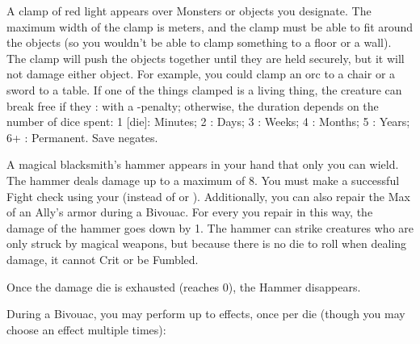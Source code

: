 {A clamp of red light appears over \DICE Monsters or objects you designate. The maximum width of the clamp is \DICE meters, and the clamp must be able to fit around the objects (so you wouldn't be able to clamp something to a floor or a wall).  The clamp will push the objects together until they are held securely, but it will not damage either object.  For example, you could clamp an orc to a chair or a sword to a table.  If one of the things clamped is a living thing, the creature can break free if they \RB : \VIG with a -\DICE penalty; otherwise, the duration depends on the number of dice spent:  1 [die]: Minutes; 2 \DICE: Days; 3 \DICE: Weeks; 4 \DICE: Months; 5 \DICE: Years; 6+ \DICE: Permanent.  Save negates.

\LITURGY [
  Name= Hammer of the Forge,
  Link=vulcan-liturgy-hammer,
  Paradigm= Force ,
  Save=  N ,
  Duration= Session ,
  Counter=  n/a  ,
  Keywords= None ,
  Target=   Self
]



A magical blacksmith's hammer appears in your hand that only you can wield.  The hammer deals \DICE damage up to a maximum of 8. You must make a successful Fight check using your \FOC (instead of \VIG or \DEX).   Additionally, you can also repair the Max \UD of an Ally's armor during a Bivouac.  For every \DCUP you repair in this way, the damage of the hammer goes down by 1.  The hammer can strike creatures who are only struck by magical weapons, but because there is no die to roll when dealing damage, it cannot Crit or be Fumbled.  

Once the damage die is exhausted (reaches 0), the Hammer disappears.

\LITURGY [
  Name= Hearthfire,
  Link=vulcan-liturgy-hearthfire,
  Paradigm=Elements,
  Save=0,
  Duration=Bivouac,
  Counter=n/a,
  Keywords=Splittable ,
  Target=Close allies
]

During a Bivouac, you may perform up to \DICE effects, once per die (though you may choose an effect multiple times):




\LITURGY [
  Name= Hone,
  Link=vulcan-liturgy-hone,
  Paradigm= Force ,
  Save=  0 ,
  Duration= Combat or \SUMDICE Minutes ,
  Counter=  n/a  ,
  Keywords= Splittable ,
  Target=   Close objects
]



}
